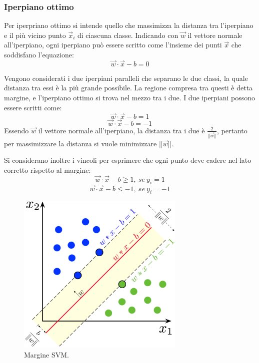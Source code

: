 \documentclass[oneside]{book}
\begin{document}


\subsubsection{Iperpiano ottimo}
Per iperpriano ottimo si intende quello che massimizza la distanza tra l'iperpiano e il più vicino punto $\vec{x}_i$ di ciascuna classe. Indicando con $\vec{w}$ il vettore normale all'iperpiano, ogni iperpiano può essere scritto come l'insieme dei punti $\vec{x}$ che soddisfano l'equazione:
$$\vec{w}\cdot\vec{x} - b = 0$$

Vengono considerati i due iperpiani paralleli che separano le due classi, la quale distanza tra essi è la più grande possibile. La regione compresa tra questi è detta margine, e l'iperpiano ottimo si trova nel mezzo tra i due. I due iperpiani possono essere scritti come:
$$\vec{w}\cdot\vec{x} - b = 1$$
$$\vec{w}\cdot\vec{x} - b = - 1$$
Essendo $\vec{w}$ il vettore normale all'iperpiano, la distanza tra i due è $\frac{2}{||\vec{w}||}$, pertanto per massimizzare la distanza si vuole minimizzare $ ||\vec{w}||$.

Si considerano inoltre i vincoli per esprimere che ogni punto deve cadere nel lato corretto rispetto al margine:
$$\vec{w}\cdot\vec{x} - b \geq 1,\ se\ y_i = 1$$
$$\vec{w}\cdot\vec{x} - b \leq - 1,\ se\ y_i = -1$$


\begin{figure}[h!]
	\centering
	\includegraphics[width=8cm]{assets/svm-margin.png}
	\caption[Caption for LOF]{Margine SVM.\footnotemark}
	\label{fig:svm-margin}
\end{figure}

\end{document}
